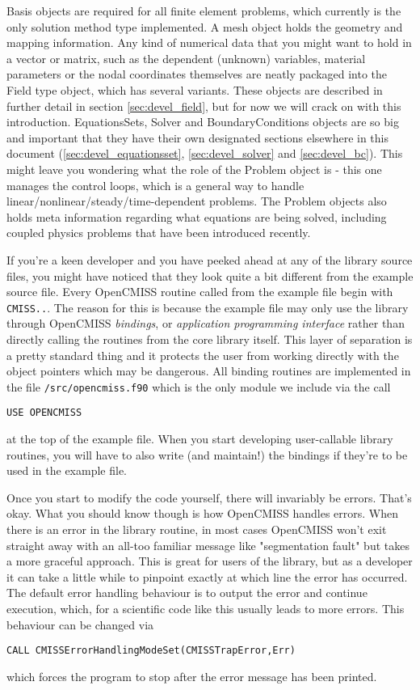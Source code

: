 Basis objects are required for all finite element problems, which currently is the only solution
method type implemented. A mesh object holds the geometry and mapping information. 
Any kind of numerical data that you might want to hold in a vector or matrix, such 
as the dependent (unknown) variables, material parameters or the nodal coordinates themselves
are neatly packaged into the Field type object, which has several variants. These objects are
described in further detail in section \ref{sec:devel_field}, but for now we will crack on with this
introduction. EquationsSets, Solver and BoundaryConditions objects are so big and important that 
they have their own designated sections elsewhere in this document (\ref{sec:devel_equationsset},
\ref{sec:devel_solver} and \ref{sec:devel_bc}). This might leave
you wondering what the role of the Problem object is - this one manages the control loops, which
is a general way to handle linear/nonlinear/steady/time-dependent problems. The Problem objects
also holds meta information regarding what equations are being solved, including coupled 
physics problems that have been introduced recently.

If you're a keen developer and you have peeked ahead at any of the library source files, you 
might have noticed that they look quite a bit different from the example source file. Every 
OpenCMISS routine called from the example file begin with \texttt{CMISS..}. The reason
for this is because the example file may only use the library through OpenCMISS \textit{bindings}, 
or \textit{application programming interface} rather than directly calling the routines from the 
core library itself. This layer of separation is a pretty standard thing and it protects the user 
from working directly with the object pointers which may be dangerous. All binding routines are 
implemented in the file \texttt{/src/opencmiss.f90} which is the only module we include via the call
\begin{lstlisting}
USE OPENCMISS
\end{lstlisting}
at the top of the example file. When you start developing user-callable library routines, you 
will have to also write (and maintain!) the bindings if they're to be used in the example file.

Once you start to modify the code yourself, there will invariably be errors. That's okay. What
you should know though is how OpenCMISS handles errors. When there is an error in the library
routine, in most cases OpenCMISS won't exit straight away with an all-too familiar message like 
"segmentation fault" but takes a more graceful approach. This is great for users of the library, 
but as a developer it can take a little while to pinpoint exactly at which line the error has 
occurred. The default error handling behaviour is to output the error and continue execution, 
which, for a scientific code like this usually leads to more errors. This behaviour can be 
changed via
\begin{lstlisting}
CALL CMISSErrorHandlingModeSet(CMISSTrapError,Err)
\end{lstlisting}
which forces the program to stop after the error message has been printed. 

